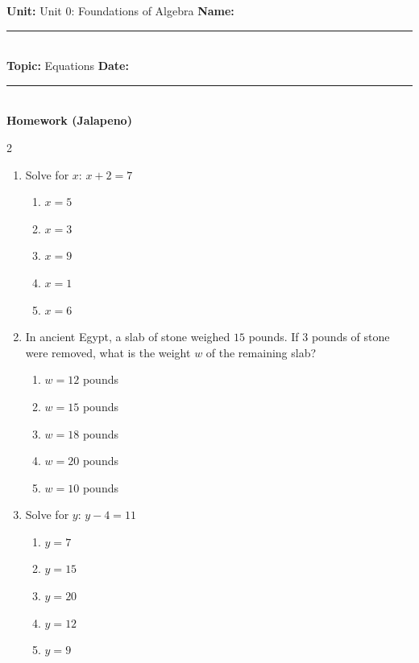 \documentclass[10pt]{article}
\begin{document}
\enlargethispage{2.5cm}

\begin{tcolorbox}[colback=mainblue!5, colframe=mainblue, sharp corners, boxrule=0.5pt]
    \small \textbf{Unit:} Unit 0: Foundations of Algebra \hfill \textbf{Name:} \rule{3cm}{0.4pt} \\
    \small \textbf{Topic:} Equations \hfill \textbf{Date:} \rule{2cm}{0.4pt} \\
    \centering \textbf{\large Homework (Jalapeno)}
\end{tcolorbox}

\vspace{0.2cm}

\begin{multicols}{2}
\begin{enumerate}[label=\textbf{Q\arabic*.}, leftmargin=*, itemsep=6pt, parsep=0pt]

  \item \small Solve for $x$: $x + 2 = 7$
  \begin{enumerate}[label=(\Alph*), leftmargin=0.6cm, nosep, itemsep=2pt]
    \item $x = 5$
    \item $x = 3$
    \item $x = 9$
    \item $x = 1$
    \item $x = 6$
  \end{enumerate}

  \item \small In ancient Egypt, a slab of stone weighed $15$ pounds. If $3$ pounds of stone were removed, what is the weight $w$ of the remaining slab?
  \begin{enumerate}[label=(\Alph*), leftmargin=0.6cm, nosep, itemsep=2pt]
    \item $w = 12$ pounds
    \item $w = 15$ pounds
    \item $w = 18$ pounds
    \item $w = 20$ pounds
    \item $w = 10$ pounds
  \end{enumerate}

  \item \small Solve for $y$: $y - 4 = 11$
  \begin{enumerate}[label=(\Alph*), leftmargin=0.6cm, nosep, itemsep=2pt]
    \item $y = 7$
    \item $y = 15$
    \item $y = 20$
    \item $y = 12$
    \item $y = 9$
  \end{enumerate}


\end{enumerate}
\end{multicols}
\end{document}
